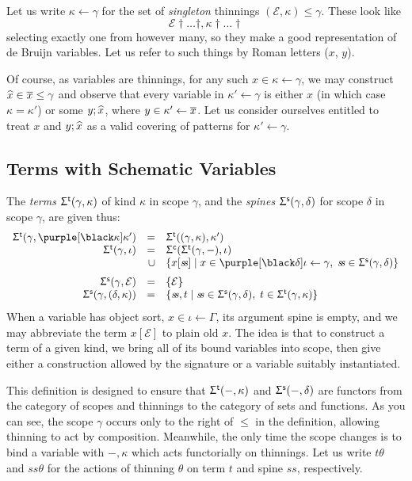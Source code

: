 \documentclass[natbib]{article}
\newcommand{\EC}{\mathcal{E}}
\begin{document}
\newcommand{\fae}{\leftarrow}
Let us write $\kappa\fae\gamma$ for the set of \emph{singleton} thinnings $(\EC,\kappa)\le\gamma$. These
look like
\[
\EC\dag\ldots\dag,\kappa\dag\ldots\dag
\]
selecting exactly one from however many, so they make a good representation of de Bruijn variables. Let us refer to such things by Roman letters ($x$, $y$).

Of course, as variables are thinnings, for any such $x\in\kappa\fae\gamma$, we may construct $\widehat x \in \overline x\le\gamma$ and observe that every variable in $\kappa'\fae\gamma$ is either $x$ (in which case $\kappa=\kappa'$) or some $y;\widehat x$, where $y\in \kappa'\fae\tcs x$. Let us consider ourselves entitled to treat $x$ and
$y;\widehat x$ as a valid covering of patterns for $\kappa'\fae\gamma$.


\subsection{Terms with Schematic Variables}
\newcommand{\Sgt}[2]{\Sg^{\mathsf{t}}(#1,#2)} 
\newcommand{\Sgs}[2]{\Sg^{\mathsf{s}}(#1,#2)}
\newcommand{\sss}{\mathit{s\!s}} 
The \emph{terms} $\Sgt\gamma\kappa$ of kind $\kappa$ in scope $\gamma$, and the \emph{spines}
$\Sgs\gamma\delta$ for scope $\delta$ in scope $\gamma$, are given thus:
\[\begin{array}{rrl}
\Sgt\gamma{\bnd\kappa\kappa'} & = & \Sgt{(\gamma,\kappa)}{\kappa'} \\
\Sgt\gamma{\iota} & = & \Sgc{\Sgt\gamma-}\iota \\
                  & \cup & \{x[\sss] \;|\; x\in\bnd\delta\iota\fae\gamma,\; \sss\in\Sgs\gamma\delta\} \medskip \\
\Sgs\gamma\EC & = & \{\EC\} \\
\Sgs\gamma{(\delta,\kappa)} & = & \{\sss,t \;|\; \sss\in \Sgs\gamma\delta,\; t\in \Sgt\gamma\kappa\}
\end{array}\]
When a variable has object sort, $x\in\iota\fae\Gamma$, its argument spine is empty, and we may abbreviate the term $x[\EC]$ to plain old $x$. The idea is that to construct a term of a given kind, we bring all of its bound variables into scope, then give either a construction allowed by the signature or a variable suitably instantiated.

This definition is designed to ensure that $\Sgt-\kappa$ and $\Sgs-\delta$ are functors from the category of scopes and thinnings to the category of sets and functions. As you can see, the scope $\gamma$ occurs only to the right of $\le$ in the definition, allowing thinning to act by composition. Meanwhile, the only time the scope changes is to bind a variable with $-,\kappa$ which acts functorially on thinnings. Let us write $t\theta$ and $\sss\theta$ for the actions of thinning $\theta$ on term $t$ and spine $\sss$, respectively.
\end{document}
